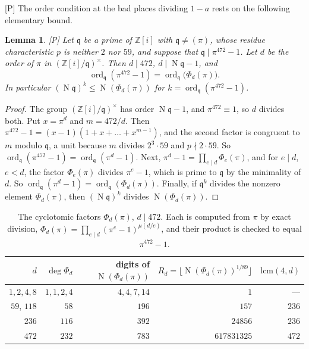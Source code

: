 \documentclass[11pt,a4paper]{article}
\newcommand{\Z}{\mathbb{Z}}
\newcommand{\ord}{\operatorname{ord}}
\newcommand{\Nm}{\operatorname{N}}
\newcommand{\tP}{\textup{[P]}}
\theoremstyle{plain}
\newtheorem{lemma}[theorem]{Lemma}
\theoremstyle{definition}
\begin{document}
\tP{} The order condition at the bad places dividing $1-a$ rests on the following elementary bound.

\begin{lemma}\label{l:cyclo}
\tP{} Let $\mathfrak q$ be a prime of $\Z[i]$ with $\mathfrak q\ne(\pi)$, whose residue characteristic $p$ is neither
$2$ nor $59$, and suppose that $\mathfrak q\mid\pi^{472}-1$. Let $d$ be the order of $\pi$ in $(\Z[i]/\mathfrak
q)^\times$. Then $d\mid472$, $d\mid\Nm\mathfrak q-1$, and
\[
 \ord_{\mathfrak q}(\pi^{472}-1)=\ord_{\mathfrak q}\bigl(\Phi_d(\pi)\bigr).
\]
In particular $(\Nm\mathfrak q)^k\le\Nm(\Phi_d(\pi))$ for $k=\ord_{\mathfrak q}(\pi^{472}-1)$.
\end{lemma}

\begin{proof}
The group $(\Z[i]/\mathfrak q)^\times$ has order $\Nm\mathfrak q-1$, and $\pi^{472}\equiv1$, so $d$ divides both. Put
$x=\pi^d$ and $m=472/d$. Then $\pi^{472}-1=(x-1)(1+x+\dots+x^{m-1})$, and the second factor is congruent to $m$ modulo
$\mathfrak q$, a unit because $m$ divides $2^3\cdot59$ and $p\nmid2\cdot59$. So $\ord_{\mathfrak
q}(\pi^{472}-1)=\ord_{\mathfrak q}(\pi^d-1)$. Next, $\pi^d-1=\prod_{e\mid d}\Phi_e(\pi)$, and for $e\mid d$, $e<d$, the
factor $\Phi_e(\pi)$ divides $\pi^e-1$, which is prime to $\mathfrak q$ by the minimality of $d$. So
$\ord_{\mathfrak q}(\pi^d-1)=\ord_{\mathfrak q}(\Phi_d(\pi))$. Finally, if $\mathfrak q^k$ divides the nonzero element
$\Phi_d(\pi)$, then $(\Nm\mathfrak q)^k$ divides $\Nm(\Phi_d(\pi))$.
\end{proof}

\begin{table}[ht]
\centering\small
\begin{tabular}{@{}rrrrr@{}}
\toprule
$d$ & $\deg\Phi_d$ & digits of $\Nm(\Phi_d(\pi))$ & $R_d=\lfloor\Nm(\Phi_d(\pi))^{1/89}\rfloor$ & $\mathrm{lcm}(4,d)$\\
\midrule
$1,2,4,8$ & $1,1,2,4$ & $4,4,7,14$ & $1$ & ---\\
$59$, $118$ & $58$ & $196$ & $157$ & $236$\\
$236$ & $116$ & $392$ & $24856$ & $236$\\
$472$ & $232$ & $783$ & $617831325$ & $472$\\
\bottomrule
\end{tabular}
\caption{The cyclotomic factors $\Phi_d(\pi)$, $d\mid472$. Each is computed from $\pi$ by exact division,
$\Phi_d(\pi)=\prod_{e\mid d}(\pi^e-1)^{\mu(d/e)}$, and their product is checked to equal $\pi^{472}-1$.}
\label{tab:cyclo}
\end{table}
\end{document}
